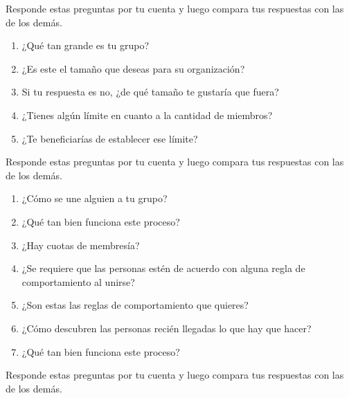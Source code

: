 
Responde estas preguntas por tu cuenta y
luego compara tus respuestas con las de los demás.


\begin{enumerate}

\item
¿Qué tan grande es tu grupo?

\item
  ¿Es este el tamaño que deseas para su organización?

\item
  Si tu respuesta es no, ¿de qué tamaño te gustaría que fuera?

\item
  ¿Tienes algún límite en cuanto a la cantidad de miembros?

\item
  ¿Te beneficiarías de establecer ese límite?

\end{enumerate}


Responde estas preguntas por tu cuenta y
luego compara tus respuestas con las de los demás.


\begin{enumerate}

\item
  ¿Cómo se une alguien a tu grupo?

\item
  ¿Qué tan bien funciona este proceso?

\item
    ¿Hay cuotas de membresía?

\item
  ¿Se requiere que las personas estén de acuerdo con alguna regla de comportamiento al unirse?

\item
  ¿Son estas las reglas de comportamiento que quieres?

\item
  ¿Cómo descubren las personas recién llegadas lo que hay que hacer?

\item
  ¿Qué tan bien funciona este proceso?
 
\end{enumerate}


Responde estas preguntas por tu cuenta y
luego compara tus respuestas con las de los demás.



